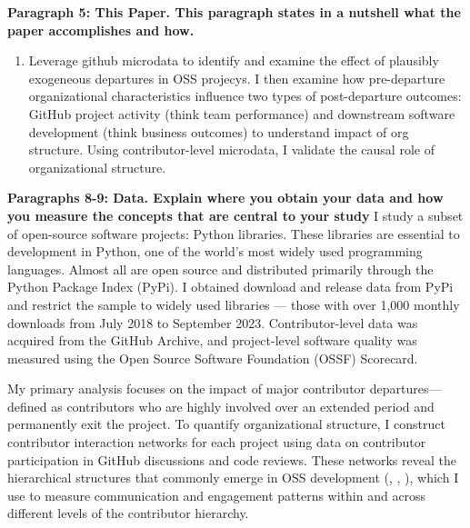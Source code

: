 \documentclass[12pt,notitlepage]{article}
\begin{document}
\textbf{Paragraph 5: This Paper. This paragraph states in a nutshell what the paper accomplishes and how. }

\begin{enumerate}
    \item Leverage github microdata to identify and examine the effect of plausibly exogeneous departures in OSS projecys. I then examine how pre-departure organizational characteristics influence two types of post-departure outcomes: GitHub project activity (think team performance) and downstream software development (think business outcomes) to understand impact of org structure. Using contributor-level microdata, I validate the causal role of organizational structure.

\end{enumerate}



\textbf{Paragraphs 8-9: Data. Explain where you obtain your data and how you measure the concepts that
are central to your study}
I study a subset of open-source software projects: Python libraries. These libraries are essential to development in Python, one of the world’s most widely used programming languages. Almost all are open source and distributed primarily through the Python Package Index (PyPi). I obtained download and release data from PyPi and restrict the sample to widely used libraries — those with over 1,000 monthly downloads from July 2018 to September 2023. Contributor-level data was acquired from the GitHub Archive, and project-level software quality was measured using the Open Source Software Foundation (OSSF) Scorecard. 

My primary analysis focuses on the impact of major contributor departures—defined as contributors who are highly involved over an extended period and permanently exit the project. To quantify organizational structure, I construct contributor interaction networks for each project using data on contributor participation in GitHub discussions and code reviews. These networks reveal the hierarchical structures that commonly emerge in OSS development (\cite{crowston_coordination_2005}, \cite{crowston_core_2006}, \cite{crowston_hierarchy_2006}), which I use to measure communication and engagement patterns within and across different levels of the contributor hierarchy.
\end{document}

